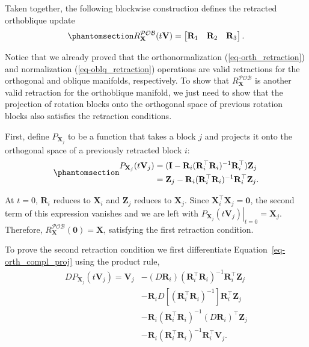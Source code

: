 \documentclass[
  12pt,
  letterpaper,
  article]{scrartcl}
\begin{document}
Taken together, the following blockwise construction defines the
retracted orthoblique update
\begin{equation}\protect\phantomsection\label{eq-orthblq-retraction}{
R_{\mathbf{X}}^{\mathcal{POB}}(t\mathbf{V}) = \begin{bmatrix} \mathbf{R}_1 & \mathbf{R}_2 & \mathbf{R}_3 \end{bmatrix}.
}\end{equation}

Notice that we already proved that the orthonormalization
(\ref{eq-orth_retraction}) and normalization (\ref{eq-oblq_retraction})
operations are valid retractions for the orthogonal and oblique
manifolds, respectively. To show that \(R_{\mathbf{X}}^{\mathcal{POB}}\)
is another valid retraction for the orthoblique manifold, we just need
to show that the projection of rotation blocks onto the orthogonal space
of previous rotation blocks also satisfies the retraction conditions.

First, define \(P_{\mathbf{X}_j}\) to be a function that takes a block
\(j\) and projects it onto the orthogonal space of a previously
retracted block \(i\):
\begin{equation}\protect\phantomsection\label{eq-orth_compl_proj}{
\begin{aligned}
P_{\mathbf{X}_j}(t\mathbf{V}_j) &= (\mathbf{I} - \mathbf{R}_i(\mathbf{R}_i^\top\mathbf{R}_i)^{-1}\mathbf{R}_i^\top) \mathbf{Z}_j \\ 
&= \mathbf{Z}_j-\mathbf{R}_i(\mathbf{R}_i^\top\mathbf{R}_i)^{-1}\mathbf{R}_i^\top\mathbf{Z}_j.
\end{aligned}
}\end{equation}

At \(t=0\), \(\mathbf{R}_i\) reduces to \(\mathbf{X}_i\) and
\(\mathbf{Z}_j\) reduces to \(\mathbf{X}_j\). Since
\(\mathbf{X}_i^\top \mathbf{X}_j = \mathbf{0}\), the second term of this
expression vanishes and we are left with
\(\left. P_{\mathbf{X}_j}(t\mathbf{V}_j) \right |_{t=0} = \mathbf{X}_j\).
Therefore, \(R_{\mathbf{X}}^{\mathcal{POB}}(\mathbf{0}) = \mathbf{X}\),
satisfying the first retraction condition.

To prove the second retraction condition we first differentiate
Equation~\ref{eq-orth_compl_proj} using the product rule, \[
\begin{aligned}
DP_{\mathbf{X}_j}(t\mathbf{V}_j)
= \mathbf{V}_j&-(D\mathbf{R}_i)(\mathbf{R}_i^\top\mathbf{R}_i)^{-1}\mathbf{R}_i^\top\mathbf{Z}_j\\
&-\mathbf{R}_iD\!\left[(\mathbf{R}_i^\top\mathbf{R}_i)^{-1}\right]\mathbf{R}_i^\top\mathbf{Z}_j\\
&-\mathbf{R}_i(\mathbf{R}_i^\top\mathbf{R}_i)^{-1}(D\mathbf{R}_i)^\top\mathbf{Z}_j\\
&-\mathbf{R}_i(\mathbf{R}_i^\top\mathbf{R}_i)^{-1}\mathbf{R}_i^\top\mathbf{V}_j.
\end{aligned}
\]
\end{document}
